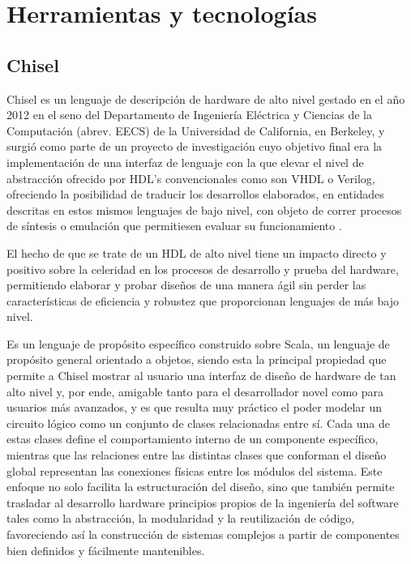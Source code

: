 \chapter{Herramientas y tecnologías}


\section{Chisel}

Chisel es un lenguaje de descripción de hardware de alto nivel gestado en el año 2012 en el seno del Departamento de Ingeniería Eléctrica y Ciencias de la Computación (abrev. EECS) de la Universidad de California, en Berkeley, y surgió como parte de un proyecto de investigación cuyo objetivo final era la implementación de una interfaz de lenguaje con la que elevar el nivel de abstracción ofrecido por HDL's convencionales como son VHDL o Verilog, ofreciendo la posibilidad de traducir los desarrollos elaborados, en entidades descritas en estos mismos lenguajes de bajo nivel, con objeto de correr procesos de síntesis o emulación que permitiesen evaluar su funcionamiento \cite{chiselEECS}.

El hecho de que se trate de un HDL de alto nivel tiene un impacto directo y positivo sobre la celeridad en los procesos de desarrollo y prueba del hardware, permitiendo elaborar y probar diseños de una manera ágil sin perder las características de eficiencia y robustez que proporcionan lenguajes de más bajo nivel.

Es un lenguaje de propósito específico construido sobre Scala, un lenguaje de propósito general orientado a objetos, siendo esta la principal propiedad que permite a Chisel mostrar al usuario una interfaz de diseño de hardware de tan alto nivel y, por ende, amigable tanto para el desarrollador novel como para usuarios más avanzados, y es que resulta muy práctico el poder modelar un circuito lógico como un conjunto de clases relacionadas entre sí. Cada una de estas clases define el comportamiento interno de un componente específico, mientras que las relaciones entre las distintas clases que conforman el diseño global representan las conexiones físicas entre los módulos del sistema. Este enfoque no solo facilita la estructuración del diseño, sino que también permite trasladar al desarrollo hardware principios propios de la ingeniería del software tales como la abstracción, la modularidad y la reutilización de código, favoreciendo así la construcción de sistemas complejos a partir de componentes bien definidos y fácilmente mantenibles.

